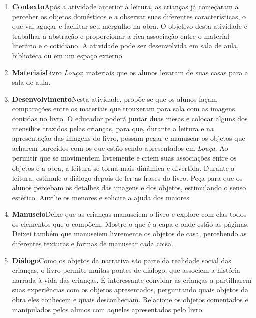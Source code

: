 \documentclass[11pt]{extarticle}
\begin{document}
\begin{enumerate}
\item \textbf{Contexto}\quad Após a atividade anterior à leitura, as crianças já 
começaram a perceber os objetos domésticos e a observar suas diferentes características, o que vai aguçar e facilitar seu mergulho na obra. O objetivo desta atividade é
trabalhar a abstração e proporcionar a rica associação entre o material literário e o cotidiano. A atividade pode ser desenvolvida em sala de aula, biblioteca ou em um espaço externo.

\item \textbf{Materiais}\quad Livro \textit{Louça}; materiais que os alunos levaram de suas casas para a sala de aula.


\item \textbf{Desenvolvimento}\quad Nesta atividade, propõe-se que os alunos façam comparações entre os materiais que trouxeram para sala com as imagens contidas no livro.
O educador poderá juntar duas mesas e colocar alguns dos utensílios trazidos pelas crianças, para que, durante a leitura e na apresentação das imagens do livro, possam pegar e manusear os objetos que acharem parecidos com os que estão sendo apresentados em \textit{Louça}. Ao permitir que se movimentem livremente e criem suas associações entre os objetos e a obra, a leitura se torna mais dinâmica e divertida. Durante a leitura, estimule o diálogo depois de ler as frases do livro. Peça para que os alunos percebam os detalhes das imagens e dos objetos, estimulando o senso estético. Auxilie os menores e solicite a ajuda dos maiores. 
 
\item \textbf{Manuseio}\quad Deixe que as crianças manuseiem o livro 
e explore com elas todos os elementos que o compõem. Mostre o que é a 
capa e onde estão as páginas. Deixei também que manuseiem livremente os objetos de casa, percebendo as diferentes texturas e formas de manusear cada coisa.

\item \textbf{Diálogo}\quad Como os objetos da narrativa são parte da realidade social das crianças, o livro permite muitas pontes de diálogo, que associem a história narrada à vida das crianças.
É interessante convidar as crianças a partilharem suas experiências com os objetos apresentados, perguntando quais objetos da obra eles conhecem e quais desconheciam. Relacione os objetos comentados e manipulados pelos alunos com aqueles apresentados pelo livro.


\end{enumerate}
\end{document}
